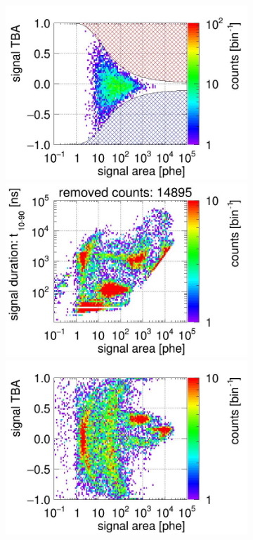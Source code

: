 \begin{landscape}
\begin{figure}[!p]
\begin{subfigure}[t]{0.33\textwidth}
			\includegraphics[width=\figurewidth,clip,trim={0 98 0 40}]{Figures/GasTest/CutsValid/res64769/tbapa29Vecfig64769.jpg}
			\includegraphics[width=\figurewidth,clip,trim={0 98 0 10}]{Figures/GasTest/CutsValid/res64769/pdpaX29Vecfig64769.jpg}
			\includegraphics[width=\figurewidth,clip,trim={0 0 0 40}]{Figures/GasTest/CutsValid/res64769/tbapaX29Vecfig64769.jpg}

\end{subfigure}
\end{figure}
\end{landscape}
